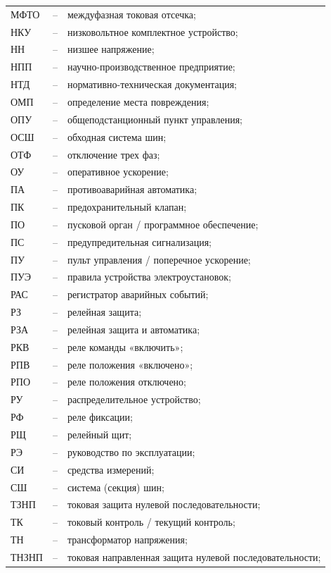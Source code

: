 \begin{longtable}{>{\raggedright\arraybackslash}m{2cm}>{\raggedright\arraybackslash}m{0.5cm}>{\raggedright\arraybackslash}m{20cm}}
МФТО & -- & междуфазная токовая отсечка; \\
НКУ & -- & низковольтное комплектное устройство; \\
НН & -- & низшее напряжение; \\
НПП & -- & научно-производственное предприятие; \\
НТД & -- & нормативно-техническая документация; \\
ОМП & -- & определение места повреждения; \\
ОПУ & -- & общеподстанционный пункт управления; \\
ОСШ & -- & обходная система шин; \\
ОТФ & -- & отключение трех фаз; \\
ОУ & -- & оперативное ускорение; \\
ПА & -- & противоаварийная автоматика; \\
ПК & -- & предохранительный клапан; \\
ПО & -- & пусковой орган / программное обеспечение; \\
ПС & -- & предупредительная сигнализация; \\
ПУ & -- & пульт управления / поперечное ускорение; \\
ПУЭ & -- & правила устройства электроустановок; \\
РАС & -- & регистратор аварийных событий; \\
РЗ & -- & релейная защита; \\
РЗА & -- & релейная защита и автоматика; \\
РКВ & -- & реле команды «включить»; \\
РПВ & -- & реле положения «включено»; \\
РПО & -- & реле положения отключено; \\
РУ & -- & распределительное устройство; \\
РФ & -- & реле фиксации; \\
РЩ & -- & релейный щит; \\
РЭ & -- & руководство по эксплуатации; \\
СИ & -- & средства измерений; \\
СШ & -- & система (секция) шин; \\
ТЗНП & -- & токовая защита нулевой последовательности; \\
ТК & -- & токовый контроль / текущий контроль; \\
ТН & -- & трансформатор напряжения; \\
ТНЗНП & -- & токовая направленная защита нулевой последовательности; \\

\end{longtable}
